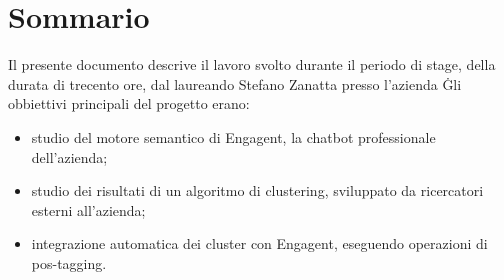 
\cleardoublepage
{}
{}
\begingroup
\let\clearpage\relax
\let\cleardoublepage\relax
\let\cleardoublepage\relax

\chapter*{Sommario}

Il presente documento descrive il lavoro svolto durante il periodo di stage, della durata di trecento ore, dal laureando Stefano Zanatta presso l'azienda \company\.
Gli obbiettivi principali del progetto erano:
\begin{itemize}
    \item studio del motore semantico di Engagent, la chatbot professionale dell'azienda;
    \item studio dei risultati di un algoritmo di clustering, sviluppato da ricercatori esterni all'azienda;
    \item integrazione automatica dei cluster con Engagent, eseguendo operazioni di pos-tagging.
\end{itemize}

%
%

\endgroup			

\vfill


